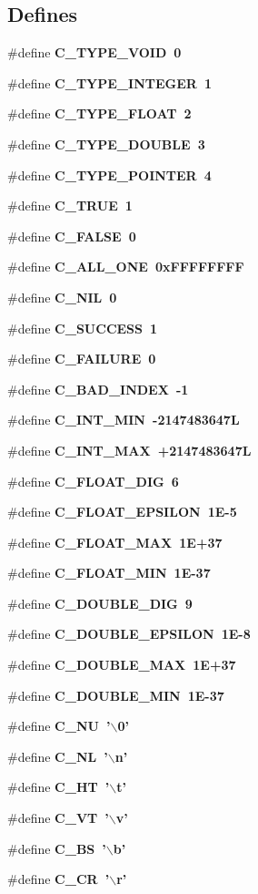 \subsection*{Defines}
\begin{CompactItemize}
\item 
\#define \bf{C\_\-TYPE\_\-VOID}~0
\item 
\#define \bf{C\_\-TYPE\_\-INTEGER}~1
\item 
\#define \bf{C\_\-TYPE\_\-FLOAT}~2
\item 
\#define \bf{C\_\-TYPE\_\-DOUBLE}~3
\item 
\#define \bf{C\_\-TYPE\_\-POINTER}~4
\item 
\#define \bf{C\_\-TRUE}~1
\item 
\#define \bf{C\_\-FALSE}~0
\item 
\#define \bf{C\_\-ALL\_\-ONE}~0x\-FFFFFFFF
\item 
\#define \bf{C\_\-NIL}~0
\item 
\#define \bf{C\_\-SUCCESS}~1
\item 
\#define \bf{C\_\-FAILURE}~0
\item 
\#define \bf{C\_\-BAD\_\-INDEX}~-1
\item 
\#define \bf{C\_\-INT\_\-MIN}~-2147483647L
\item 
\#define \bf{C\_\-INT\_\-MAX}~+2147483647L
\item 
\#define \bf{C\_\-FLOAT\_\-DIG}~6
\item 
\#define \bf{C\_\-FLOAT\_\-EPSILON}~1E-5
\item 
\#define \bf{C\_\-FLOAT\_\-MAX}~1E+37
\item 
\#define \bf{C\_\-FLOAT\_\-MIN}~1E-37
\item 
\#define \bf{C\_\-DOUBLE\_\-DIG}~9
\item 
\#define \bf{C\_\-DOUBLE\_\-EPSILON}~1E-8
\item 
\#define \bf{C\_\-DOUBLE\_\-MAX}~1E+37
\item 
\#define \bf{C\_\-DOUBLE\_\-MIN}~1E-37
\item 
\#define \bf{C\_\-NU}~'$\backslash$0'
\item 
\#define \bf{C\_\-NL}~'$\backslash$n'
\item 
\#define \bf{C\_\-HT}~'$\backslash$t'
\item 
\#define \bf{C\_\-VT}~'$\backslash$v'
\item 
\#define \bf{C\_\-BS}~'$\backslash$b'
\item 
\#define \bf{C\_\-CR}~'$\backslash$r'
\item 

\end{CompactItemize}
